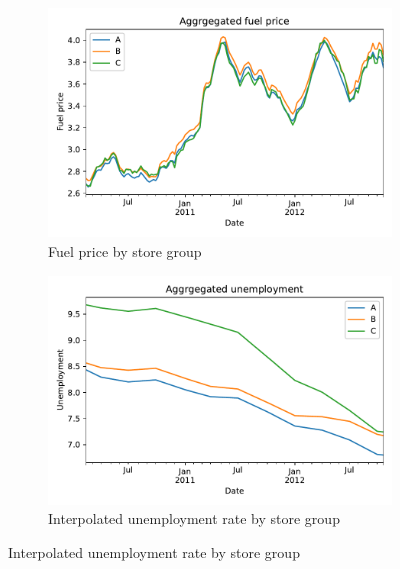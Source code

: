 \documentclass[english, 12pt, a4paper, sci, utf8, a-1b, online]{aaltothesis}
\begin{document}
\begin{figure}
	\begin{subfigure}[b]{0.5\textwidth}
		\centering
		\includegraphics[width=\textwidth]{../plots/dataset/dataset_plot_fuel_price.pdf}
		\caption{Fuel price by store group}
		\label{fig:data_fuel}
	\end{subfigure}
	\hfill
	\begin{subfigure}[b]{0.5\textwidth}
		\centering
		\includegraphics[width=\textwidth]{../plots/dataset/dataset_plot_unemployment_interpolated.pdf}
		\caption{Interpolated unemployment rate by store group}
		\label{fig:data_unemp}
	\end{subfigure}
\end{figure}

\end{document}
